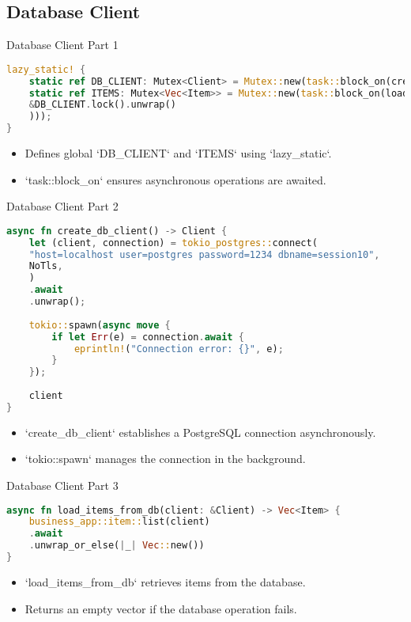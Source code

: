 \documentclass[aspectratio=169, table]{beamer}
\begin{document}
\subsection{Database Client}
\begin{frame}[fragile]{Database Client Part 1}
\begin{lstlisting}[language=Rust]
lazy_static! {
	static ref DB_CLIENT: Mutex<Client> = Mutex::new(task::block_on(create_db_client()));
	static ref ITEMS: Mutex<Vec<Item>> = Mutex::new(task::block_on(load_items_from_db(
	&DB_CLIENT.lock().unwrap()
	)));
}
\end{lstlisting}

\begin{itemize}
\item Defines global `DB\_CLIENT` and `ITEMS` using `lazy\_static`.
\item `task::block\_on` ensures asynchronous operations are awaited.
\end{itemize}
\end{frame}

\begin{frame}[fragile]{Database Client Part 2}
\begin{lstlisting}[language=Rust]
async fn create_db_client() -> Client {
	let (client, connection) = tokio_postgres::connect(
	"host=localhost user=postgres password=1234 dbname=session10",
	NoTls,
	)
	.await
	.unwrap();
	
	tokio::spawn(async move {
		if let Err(e) = connection.await {
			eprintln!("Connection error: {}", e);
		}
	});
	
	client
}
\end{lstlisting}

\begin{itemize}
\item `create\_db\_client` establishes a PostgreSQL connection asynchronously.
\item `tokio::spawn` manages the connection in the background.
\end{itemize}
\end{frame}

\begin{frame}[fragile]{Database Client Part 3}
\begin{lstlisting}[language=Rust]
async fn load_items_from_db(client: &Client) -> Vec<Item> {
	business_app::item::list(client)
	.await
	.unwrap_or_else(|_| Vec::new())
}
\end{lstlisting}

\begin{itemize}
\item `load\_items\_from\_db` retrieves items from the database.
\item Returns an empty vector if the database operation fails.
\end{itemize}
\end{frame}
\end{document}
